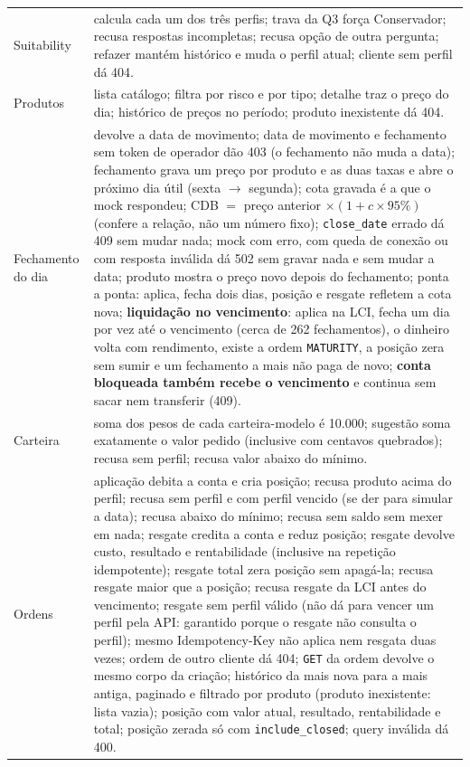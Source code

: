 \documentclass[11pt,a4paper]{article}
\newcommand{\tb}[1]{\texttt{#1}}           %
\begin{document}
\begin{longtable}{@{}P{2.4cm}P{13.7cm}@{}}
Suitability & calcula cada um dos três perfis; trava da Q3 força Conservador; recusa respostas incompletas; recusa opção de outra pergunta; refazer mantém histórico e muda o perfil atual; cliente sem perfil dá 404. \\
Produtos & lista catálogo; filtra por risco e por tipo; detalhe traz o preço do dia; histórico de preços no período; produto inexistente dá 404. \\
Fechamento do dia & devolve a data de movimento; data de movimento e fechamento sem token de operador dão 403 (o fechamento não muda a data); fechamento grava um preço por produto e as duas taxas e abre o próximo dia útil (sexta $\to$ segunda); cota gravada é a que o mock respondeu; CDB $=$ preço anterior $\times (1 + c \times 95\%)$ (confere a relação, não um número fixo); \tb{close_date} errado dá 409 sem mudar nada; mock com erro, com queda de conexão ou com resposta inválida dá 502 sem gravar nada e sem mudar a data; produto mostra o preço novo depois do fechamento; ponta a ponta: aplica, fecha dois dias, posição e resgate refletem a cota nova; \textbf{liquidação no vencimento}: aplica na LCI, fecha um dia por vez até o vencimento (cerca de 262 fechamentos), o dinheiro volta com rendimento, existe a ordem \tb{MATURITY}, a posição zera sem sumir e um fechamento a mais não paga de novo; \textbf{conta bloqueada também recebe o vencimento} e continua sem sacar nem transferir (409). \\
Carteira & soma dos pesos de cada carteira-modelo é 10.000; sugestão soma exatamente o valor pedido (inclusive com centavos quebrados); recusa sem perfil; recusa valor abaixo do mínimo. \\
Ordens & aplicação debita a conta e cria posição; recusa produto acima do perfil; recusa sem perfil e com perfil vencido (se der para simular a data); recusa abaixo do mínimo; recusa sem saldo sem mexer em nada; resgate credita a conta e reduz posição; resgate devolve custo, resultado e rentabilidade (inclusive na repetição idempotente); resgate total zera posição sem apagá-la; recusa resgate maior que a posição; recusa resgate da LCI antes do vencimento; resgate sem perfil válido (não dá para vencer um perfil pela API: garantido porque o resgate não consulta o perfil); mesmo Idempotency-Key não aplica nem resgata duas vezes; ordem de outro cliente dá 404; \tb{GET} da ordem devolve o mesmo corpo da criação; histórico da mais nova para a mais antiga, paginado e filtrado por produto (produto inexistente: lista vazia); posição com valor atual, resultado, rentabilidade e total; posição zerada só com \tb{include_closed}; query inválida dá 400. \\

\end{longtable}
\end{document}
